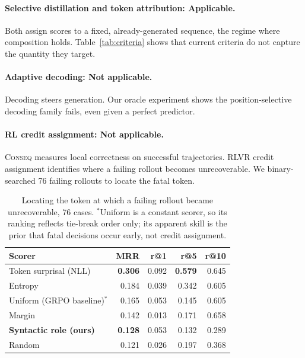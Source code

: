 \documentclass[twoside,11pt]{article}
\begin{document}
\paragraph{Selective distillation and token attribution: Applicable.} Both assign scores to a fixed, already-generated sequence, the regime where composition holds. Table~\ref{tab:criteria} shows that current criteria do not capture the quantity they target.

\paragraph{Adaptive decoding: Not applicable.} Decoding steers generation. Our oracle experiment shows the position-selective decoding family fails, even given a perfect predictor.

\paragraph{RL credit assignment: Not applicable.}
\textsc{Conseq} measures local correctness on successful trajectories. RLVR credit assignment identifies where a failing rollout becomes unrecoverable. We binary-searched 76 failing rollouts to locate the fatal token.

\begin{table}[h]
\centering\small
\begin{tabular}{lrrrr}
\toprule
Scorer & MRR & r@1 & r@5 & r@10 \\
\midrule
Token surprisal (NLL)        & \textbf{0.306} & 0.092 & \textbf{0.579} & 0.645 \\
Entropy                      & 0.184 & 0.039 & 0.342 & 0.605 \\
Uniform (GRPO baseline)$^*$  & 0.165 & 0.053 & 0.145 & 0.605 \\
Margin                       & 0.142 & 0.013 & 0.171 & 0.658 \\
\textbf{Syntactic role (ours)} & \textbf{0.128} & 0.053 & 0.132 & 0.289 \\
Random                       & 0.121 & 0.026 & 0.197 & 0.368 \\
\bottomrule
\end{tabular}
\caption{Locating the token at which a failing rollout became unrecoverable, 76 cases.
$^*$Uniform is a constant scorer, so its ranking reflects tie-break order only; its apparent skill is
the prior that fatal decisions occur early, not credit assignment.}
\label{tab:credit}
\end{table}
\end{document}
